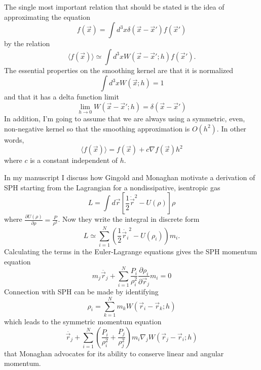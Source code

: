 The single most important relation that should be stated is the idea of approximating the equation
\begin{equation}
f({\vec x}) = \int d^3x \delta({\vec x} - {\vec x}') f({\vec x}')
\end{equation}
by the relation
\begin{equation}\label{sph_fun}
\langle f({\vec x}) \rangle  \simeq \int d^3x W({\vec x} - {\vec x}'; h) f({\vec x}').
\end{equation}
The essential properties on the smoothing kernel are that it is normalized
\begin{equation}\label{norm}
\int d^3x W({\vec x};h) = 1
\end{equation}
and that it has a delta function limit
\begin{equation}
\lim_{h \rightarrow 0} W({\vec x} - {\vec x}';h) = \delta({\vec x} - {\vec x}')
\end{equation}
In addition, I'm going to assume that we are always using a symmetric, even, non-negative kernel so that the smoothing approximation is $O(h^2)$.  In other words,
\begin{equation}
\langle f({\vec x}) \rangle = f({\vec x}) + c\nabla f({\vec x}) h^2
\end{equation}
where $c$ is a constant independent of $h$.  

In my manuscript I discuss how Gingold and Monaghan motivate a derivation of SPH starting from the Lagrangian for a nondissipative, isentropic gas
\begin{equation}
L = \int d{\vec r} \left[ \frac{1}{2} {\dot {\vec r} }^2 - U(\rho) \right] \rho
\end{equation}
where $\frac{\partial U(\rho)}{\partial \rho} = \frac{P}{\rho^2}$.  Now they write the integral in discrete form
\begin{equation}
L \simeq \sum_{i=1}^{N} \left( \frac{1}{2} {\dot {\vec r_i}}^2 - U(\rho_i) \right) m_i.
\end{equation}
Calculating the terms in the Euler-Lagrange equations gives the SPH momentum equation
\begin{equation}
m_j {\ddot {\vec r_j}} + \sum_{i=1}^{N} \frac{P_i}{\rho_i^2} \frac{\partial \rho_i}{\partial {\vec r_j}} m_i = 0
\end{equation}
Connection with SPH can be made by identifying 
\begin{equation}
\rho_i = \sum_{k=1}^{N} m_k W ( {\vec r_i} - {\vec r_k}; h )
\end{equation}
which leads to the symmetric momentum equation
\begin{equation}
{\ddot {\vec r_j}} + \sum_{i=1}^{N} \left( \frac{P_i}{\rho_i^2} + \frac{P_j}{\rho_j^2} \right) m_i \nabla_j W ( {\vec r_j} - {\vec r_i}; h )
\end{equation} 
that Monaghan advocates for its ability to conserve linear and angular momentum.


